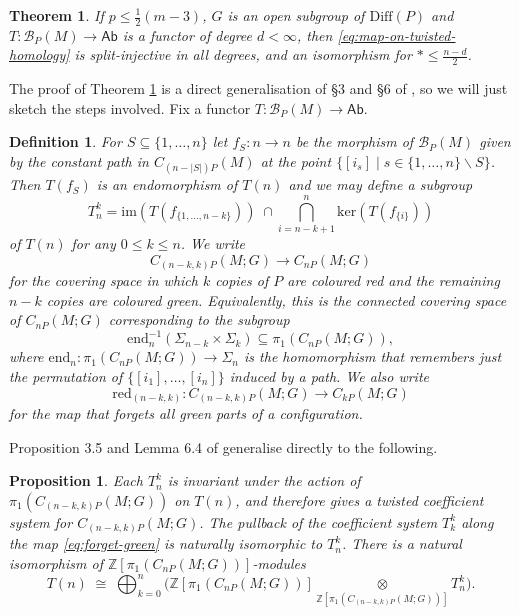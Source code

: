 \documentclass[reqno,a4paper]{article}
\numberwithin{equation}{section}
\theoremstyle{italicised}
\newtheorem{prop}[thm]{Proposition}
\newtheorem{athm}{Theorem}\renewcommand{\theathm}{\Alph{athm}}
\theoremstyle{upright}
\newtheorem{defn}[thm]{Definition}
\theoremstyle{italicised-restate}
\newcommand{\cB}{\mathcal{B}}
\newcommand{\bZ}{\mathbb{Z}}
\renewcommand{\leq}{\leqslant}
\begin{document}
\begin{athm}\label{ttwisted}
If $p \leq \tfrac12(m-3)$, $G$ is an open subgroup of $\mathrm{Diff}(P)$ and $T \colon \cB_P(M) \to \mathsf{Ab}$ is a functor of degree $d < \infty$, then \eqref{eq:map-on-twisted-homology} is split-injective in all degrees, and an isomorphism for $* \leq \tfrac{n-d}{2}$.
\end{athm}

The proof of Theorem \ref{ttwisted} is a direct generalisation of \S 3 and \S 6 of \cite{Palmer2018Twistedhomologicalstability}, so we will just sketch the steps involved. Fix a functor $T \colon \cB_P(M) \to \mathsf{Ab}$.

\begin{defn}\label{d:endred}
For $S \subseteq \{1,\ldots,n\}$ let $f_S \colon n \to n$ be the morphism of $\cB_P(M)$ given by the constant path in $C_{(n - \lvert S \rvert)P}(M)$ at the point $\{ [i_s] \mid s \in \{1,\ldots,n\} \smallsetminus S \}$. Then $T(f_S)$ is an endomorphism of $T(n)$ and we may define a subgroup
\[
T_n^k = \mathrm{im}(T(f_{\{1,\ldots,n-k\}})) \; \cap \!\! \bigcap_{i=n-k+1}^n \mathrm{ker}(T(f_{\{i\}}))
\]
of $T(n)$ for any $0 \leq k \leq n$. We write
\begin{equation}\label{eq:covering-space}
C_{(n-k,k)P}(M;G) \longrightarrow C_{nP}(M;G)
\end{equation}
for the covering space in which $k$ copies of $P$ are coloured red and the remaining $n-k$ copies are coloured green. Equivalently, this is the connected covering space of $C_{nP}(M;G)$ corresponding to the subgroup
\[
\mathrm{end}_n^{-1}(\Sigma_{n-k} \times \Sigma_k) \subseteq \pi_1(C_{nP}(M;G)),
\]
where $\mathrm{end}_n \colon \pi_1(C_{nP}(M;G)) \to \Sigma_n$ is the homomorphism that remembers just the permutation of $\{[i_1],\ldots,[i_n]\}$ induced by a path. We also write
\begin{equation}\label{eq:forget-green}
\mathrm{red}_{(n-k,k)} \colon C_{(n-k,k)P}(M;G) \longrightarrow C_{kP}(M;G)
\end{equation}
for the map that forgets all green parts of a configuration.
\end{defn}

Proposition 3.5 and Lemma 6.4 of \cite{Palmer2018Twistedhomologicalstability} generalise directly to the following.

\begin{prop}\label{p:decomposition}
Each $T_n^k$ is invariant under the action of $\pi_1(C_{(n-k,k)P}(M;G))$ on $T(n)$, and therefore gives a twisted coefficient system for $C_{(n-k,k)P}(M;G)$. The pullback of the coefficient system $T_k^k$ along the map \eqref{eq:forget-green} is naturally isomorphic to $T_n^k$. There is a natural isomorphism of $\bZ[\pi_1(C_{nP}(M;G))]$-modules
\[
T(n) \;\cong\; \bigoplus_{k=0}^n \biggl( \bZ[\pi_1(C_{nP}(M;G))] \underset{\bZ[\pi_1(C_{(n-k,k)P}(M;G))]}{\otimes} T_n^k \biggr).
\]
\end{prop}
\end{document}
